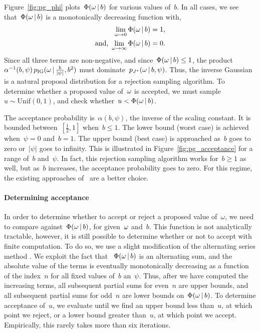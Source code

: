 Figure~\ref{fig:pg_phi} plots~$\Phi({\omega} \,|\, b)$ for various values of~$b$.
In all cases, we see that~$\Phi({\omega} \,|\, b)$ is a monotonically
decreasing function with,
\begin{align*}
  \lim_{\omega \to 0} \Phi(\omega \,|\, b) &= 1, \\
  \text{and, }
  \lim_{\omega \to \infty} \Phi(\omega \,|\, b) &= 0.
\end{align*}
Since all three terms are non-negative, and since~${\Phi({\omega} \,|\,
  b) \leq 1}$, the product~${\alpha^{-1}(b,\psi)\,
  p_{\mathrm{IG}}({\omega} \,|\, \tfrac{b}{|\psi|}, b^2)}$
must dominate~$p_{J^{*}}({\omega} \,|\, b,\psi)$.  Thus, the inverse
Gaussian is a natural proposal distribution for a rejection sampling
algorithm.  To determine whether a proposed value of~${\omega}$ is
accepted, we must sample~${u \sim \mathrm{Unif}(0,1)}$, and check
whether~$u < \Phi({\omega} \,|\, b)$.

The acceptance probability is~$\alpha(b,\psi)$, the inverse of the
scaling constant. It is bounded between~$[\tfrac{1}{2}, 1]$ when~${b
  \leq 1}$.  The lower bound (worst case) is achieved when~${\psi=0}$
and~${b=1}$.  The upper bound (best case) is approached as~$b$ goes to
zero or~$|\psi|$ goes to infinity.  This is illustrated in
Figure~\ref{fig:pg_acceptance} for a range of~$b$ and~$\psi$.
In fact, this rejection sampling algorithm works for~$b \geq 1$ as well,
but as~$b$ increases, the acceptance probability goes to zero. For
this regime, the existing approaches of~\citet{windle2014sampling} are
a better choice.

\paragraph{Determining acceptance}
In order to determine whether to accept or reject a proposed value
of~$\omega$, we need to compare against~${\Phi({\omega} \,|\, b)}$, for
given~${\omega}$ and~$b$. This function is not analytically tractable,
however, it is still possible to determine whether or not to accept
with finite computation. To do so, we use a slight modification of the
alternating series method \citep{devroye1986}.  We exploit the
fact that ~$\Phi({\omega} \,|\, b)$ is an alternating sum, and the
absolute value of the terms is eventually monotonically decreasing as
a function of the index~$n$ for all fixed values of~$b$ an~$\psi$.
Thus, after we have computed the increasing terms, all subsequent
partial sums for even~$n$ are upper bounds, and all subsequent partial
sums for odd~$n$ are lower bounds on~$\Phi({\omega}\,|\, b)$.  To
determine acceptance of~$u$, we evaluate until we find an upper bound
less than~$u$, at which point we reject, or a lower bound greater
than~$u$, at which point we accept. Empirically, this rarely takes
more than six iterations.

